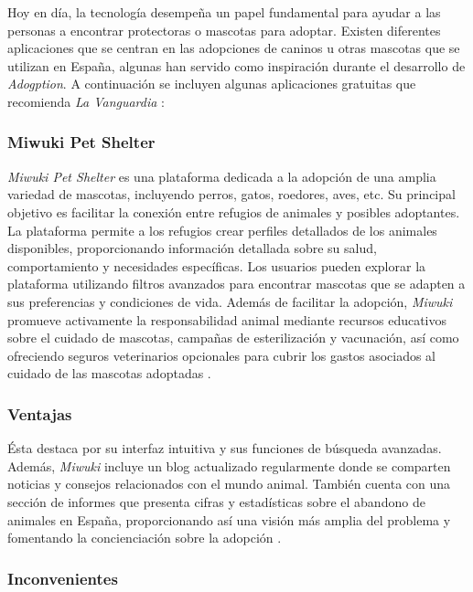 \documentclass[a4paper, 12pt]{article}
\begin{document}
Hoy en día, la tecnología desempeña un papel fundamental para ayudar a las personas a encontrar protectoras o mascotas para adoptar. Existen diferentes aplicaciones que se centran en las adopciones de caninos u otras mascotas que se utilizan en España, algunas han servido como inspiración durante el desarrollo de \textit{Adogption}. A continuación se incluyen algunas aplicaciones gratuitas que recomienda \textit{La Vanguardia} \cite{lavanguardia}: 

\subsubsection*{Miwuki Pet Shelter}

\textit{Miwuki Pet Shelter} es una plataforma dedicada a la adopción de una amplia variedad de mascotas, incluyendo perros, gatos, roedores, aves, etc. Su principal objetivo es facilitar la conexión entre refugios de animales y posibles adoptantes. La plataforma permite a los refugios crear perfiles detallados de los animales disponibles, proporcionando información detallada sobre su salud, comportamiento y necesidades específicas. Los usuarios pueden explorar la plataforma utilizando filtros avanzados para encontrar mascotas que se adapten a sus preferencias y condiciones de vida. Además de facilitar la adopción, \textit{Miwuki} promueve activamente la responsabilidad animal mediante recursos educativos sobre el cuidado de mascotas, campañas de esterilización y vacunación, así como ofreciendo seguros veterinarios opcionales para cubrir los gastos asociados al cuidado de las mascotas adoptadas \cite{miwuki}.

\subsubsection*{Ventajas}

Ésta destaca por su interfaz intuitiva y sus funciones de búsqueda avanzadas. Además, \textit{Miwuki} incluye un blog actualizado regularmente donde se comparten noticias y consejos relacionados con el mundo animal. También cuenta con una sección de informes que presenta cifras y estadísticas sobre el abandono de animales en España, proporcionando así una visión más amplia del problema y fomentando la concienciación sobre la adopción \cite{lookerstudio}.

\subsubsection*{Inconvenientes}
\end{document}
